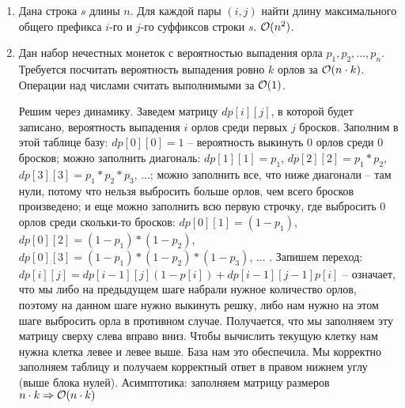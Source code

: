 \begin{enumerate}
  \item
    Дана строка $s$ длины $n$. Для каждой пары $(i, j)$ найти длину максимального
    общего префикса $i$-го и $j$-го суффиксов строки $s$. $\mathcal{O}(n^2)$.

  \item
    Дан набор нечестных монеток с вероятностью выпадения орла
    $p_1, p_2, \dots, p_n$. Требуется посчитать вероятность выпадения
    ровно $k$ орлов за $\mathcal{O}(n \cdot k)$. Операции над числами считать 
    выполнимыми за $\mathcal{O}(1)$.
  \begin{solution}
    Решим через динамику. Заведем матрицу $dp[i][j]$, в которой будет записано, вероятность выпадения $i$ орлов среди первых $j$ бросков. Заполним в этой таблице базу: $dp[0][0] = 1$ -- вероятность выкинуть 0 орлов среди 0 бросков; можно заполнить диагональ: $dp[1][1] = p_1$, $dp[2][2] = p_1*p_2$, $dp[3][3] = p_1*p_2*p_3$, ...; можно заполнить все, что ниже диагонали -- там нули, потому что нельзя выбросить больше орлов, чем всего бросков произведено; и еще можно заполнить всю первую строчку, где выбросить 0 орлов среди скольки-то бросков: $dp[0][1] = (1-p_1)$, $dp[0][2] = (1-p_1)*(1-p_2)$, $dp[0][3] = (1-p_1)*(1-p_2)*(1-p_3)$, ... . Запишем переход: $dp[i][j] = dp[i-1][j](1-p[i])+dp[i-1][j-1]p[i]$ -- означает, что мы либо на предыдущем шаге набрали нужное количество орлов, поэтому на данном шаге нужно выкинуть решку, либо нам нужно на этом шаге выбросить орла в противном случае. Получается, что мы заполняем эту матрицу сверху слева вправо вниз. Чтобы вычислить текущую клетку нам нужна клетка левее и левее выше. База нам это обеспечила. Мы корректно заполняем таблицу и получаем корректный ответ в правом нижнем углу (выше блока нулей). Асимптотика: заполняем матрицу размеров $n\cdot k \Rightarrow \mathcal{O}(n\cdot k)$
  \end{solution}



\end{enumerate}
